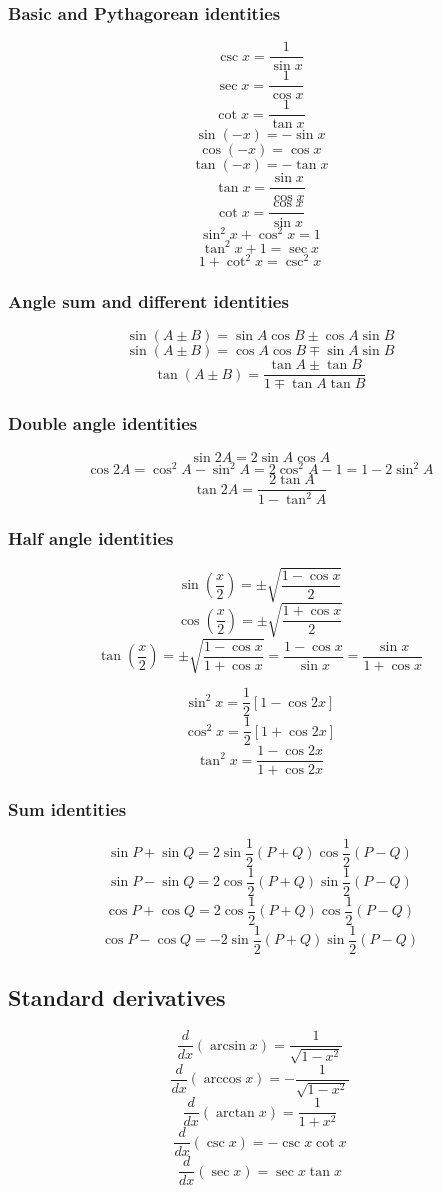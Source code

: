 \documentclass[11pt]{article}
\begin{document}
\subsubsection{Basic and Pythagorean identities}
\label{sec:org9dc937f}
\[\csc x = \frac{1}{\sin x}\]
\[\sec x = \frac{1}{\cos x}\]
\[\cot x = \frac{1}{\tan x}\]
\[\sin (-x) = - \sin x\]
\[\cos (-x) = \cos x\]
\[\tan (-x) = - \tan x\]
\[\tan x = \frac{\sin x}{\cos x}\]
\[\cot x = \frac{\cos x}{\sin x}\]
\[\sin^2 x + \cos^2 x = 1\]
\[\tan^2 x + 1 = \sec x\]
\[1 + \cot^2 x = \csc^2 x\]
\subsubsection{Angle sum and different identities}
\label{sec:org7afceb9}
\[\sin(A \pm B) = \sin A \cos B \pm \cos A \sin B\]
\[\sin(A \pm B) = \cos A \cos B \mp \sin A \sin B\]
\[\tan(A \pm B) = \frac{\tan A \pm \tan B}{1 \mp \tan A \tan B}\]
\subsubsection{Double angle identities}
\label{sec:org5b87277}
\[\sin 2A = 2 \sin A \cos A\]
\[\cos 2A = \cos^2 A - \sin^2 A = 2 \cos^2 A - 1 = 1 - 2 \sin^2 A\]
\[\tan 2A = \frac{2 \tan A}{1 - \tan^2 A}\]
\subsubsection{Half angle identities}
\label{sec:orge0150d9}
\[\sin \left(\frac{x}{2} \right) = \pm \sqrt{\frac{1 - \cos x}{2}}\]
\[\cos \left(\frac{x}{2} \right) = \pm \sqrt{\frac{1 + \cos x}{2}}\]
\[\tan \left(\frac{x}{2} \right) = \pm \sqrt{\frac{1 - \cos x}{1 + \cos x}} = \frac{1 - \cos x}{\sin x} = \frac{\sin x}{1 + \cos x}\]

\[\sin^2 x = \frac{1}{2} \left[1 - \cos 2x \right]\]
\[\cos^2 x = \frac{1}{2} \left[1 + \cos 2x \right]\]
\[\tan^2 x = \frac{1 - \cos 2x}{1 + \cos 2x}\]
\subsubsection{Sum identities}
\label{sec:org65ab14f}
\[\sin P + \sin Q = 2 \sin \frac{1}{2}(P + Q) \cos \frac{1}{2}(P - Q)\]
\[\sin P - \sin Q = 2 \cos \frac{1}{2}(P + Q) \sin \frac{1}{2}(P - Q)\]
\[\cos P + \cos Q = 2 \cos \frac{1}{2}(P + Q) \cos \frac{1}{2}(P - Q)\]
\[\cos P - \cos Q = - 2 \sin \frac{1}{2}(P + Q) \sin \frac{1}{2}(P - Q)\]
\subsection{Standard derivatives}
\label{sec:org6163e0f}
\[\frac{d}{dx} \left(\arcsin x \right) = \frac{1}{\sqrt{1 - x^2}}\]
\[\frac{d}{dx} \left(\arccos x \right) = - \frac{1}{\sqrt{1 - x^2}}\]
\[\frac{d}{dx} \left(\arctan x \right) = \frac{1}{1 + x^2}\]
\[\frac{d}{dx} \left(\csc x \right) = - \csc x \cot x\]
\[\frac{d}{dx} \left(\sec x \right) = \sec x \tan x\]
\end{document}
